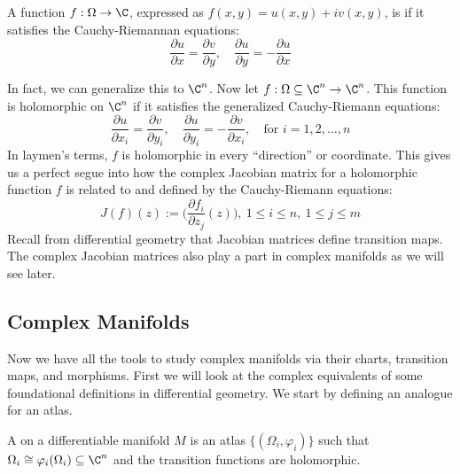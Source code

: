 \begin{definition}\label{3.2}
    A function $f: \Omega \to \C$, expressed as $f(x,y) = u(x,y) + iv(x,y)$,
    is  if it satisfies the Cauchy-Riemannan
    equations:
    \begin{equation*}
        \dfrac{\partial u}{\partial x} = \dfrac{\partial v}{\partial y}, \quad
        \dfrac{\partial u}{\partial y} = - \dfrac{\partial u}{\partial x}
    \end{equation*}
\end{definition}
In fact, we can generalize this to $\C^n$. Now let $f: \Omega \subseteq \C^n \to
\C^n$. This function is holomorphic on $\C^n$ if it satisfies the generalized 
Cauchy-Riemann equations:
\begin{equation*}
    \dfrac{\partial u}{\partial x_i} = \dfrac{\partial v}{\partial y_i}, \quad 
    \dfrac{\partial u}{\partial y_i} = - \dfrac{\partial v}{\partial x_i},\quad
    \text{for } i = 1, 2, \hdots , n
\end{equation*} 
In laymen's terms, $f$ is holomorphic in every ``direction'' or coordinate. This
gives us a perfect segue into how the complex Jacobian matrix for a holomorphic function
$f$ is related to and defined by the Cauchy-Riemann equations:
\begin{equation*}
    J(f)(z):= \bigg(\dfrac{\partial f_i}{\partial z_j}(z)\bigg), \ 1 \leq i \leq n, \
    1 \leq j \leq m
\end{equation*}
Recall from differential geometry that Jacobian matrices define transition maps.
The complex Jacobian matrices also play a part in complex manifolds as we will see
later.

\subsection{Complex Manifolds}
Now we have all the tools to study complex manifolds via their charts, transition
maps, and morphisms. First we will look at the complex equivalents of some foundational
definitions in differential geometry. We start by defining an analogue for an atlas.

\begin{definition}
    A  on a differentiable manifold $M$ is an atlas
    $\{(\Omega_i, \varphi_i)\}$ such that $\Omega_i \cong \varphi_i(\Omega_i) \subseteq
    \C^n$ and the transition functions are holomorphic.
\end{definition}

\vspace{.5cm}


